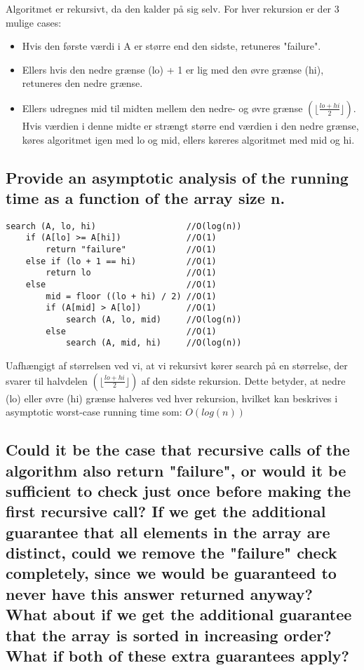 \documentclass[a4paper,12pt]{article}
\begin{document}
Algoritmet er rekursivt, da den kalder på sig selv. For hver rekursion er der 3 mulige cases:
\begin{itemize}
    \item Hvis den første værdi i A er større end den sidste, retuneres "failure".
    \item Ellers hvis den nedre grænse (lo) + 1 er lig med den øvre grænse (hi), retuneres den nedre grænse.
    \item Ellers udregnes mid til midten mellem den nedre- og øvre grænse $(\lfloor\frac{lo + hi}{2}\rfloor)$. Hvis værdien i denne midte er strængt større end værdien i den nedre grænse, køres algoritmet igen med lo og mid, ellers køreres algoritmet med mid og hi.
\end{itemize}
    
\subsection[]{Provide an asymptotic analysis of the running time as a function of the array size n.}
    
\begin{lstlisting}
search (A, lo, hi)                  //O(log(n))
    if (A[lo] >= A[hi])             //O(1)
        return "failure"            //O(1)
    else if (lo + 1 == hi)          //O(1)
        return lo                   //O(1)
    else                            //O(1)
        mid = floor ((lo + hi) / 2) //O(1)
        if (A[mid] > A[lo])         //O(1)
            search (A, lo, mid)     //O(log(n))
        else                        //O(1)
            search (A, mid, hi)     //O(log(n))
\end{lstlisting}
Uafhængigt af størrelsen ved vi, at vi rekursivt kører search på en størrelse, der svarer til halvdelen $(\lfloor\frac{lo + hi}{2}\rfloor)$ af den sidste rekursion. Dette betyder, at nedre (lo) eller øvre (hi) grænse halveres ved hver rekursion, hvilket kan beskrives i asymptotic worst-case running time som: $O(log(n))$

\subsection[]{Could it be the case that recursive calls of the algorithm also return "failure", or would it
be sufficient to check just once before making the first recursive call? If we get the additional
guarantee that all elements in the array are distinct, could we remove the "failure" check
completely, since we would be guaranteed to never have this answer returned anyway?
What about if we get the additional guarantee that the array is sorted in increasing order?
What if both of these extra guarantees apply?}
\end{document}
